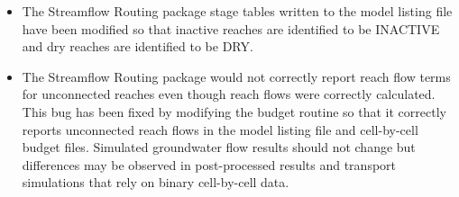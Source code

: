 \begin{itemize}
		\item The Streamflow Routing package stage tables written to the model listing file have been modified so that inactive reaches are identified to be INACTIVE and dry reaches are identified to be DRY.
		\item The Streamflow Routing package would not correctly report reach flow terms for unconnected reaches even though reach flows were correctly calculated. This bug has been fixed by modifying the budget routine so that it correctly reports unconnected reach flows in the model listing file and cell-by-cell budget files. Simulated groundwater flow results should not change but differences may be observed in post-processed results and transport simulations that rely on binary cell-by-cell data.
	\end{itemize}



